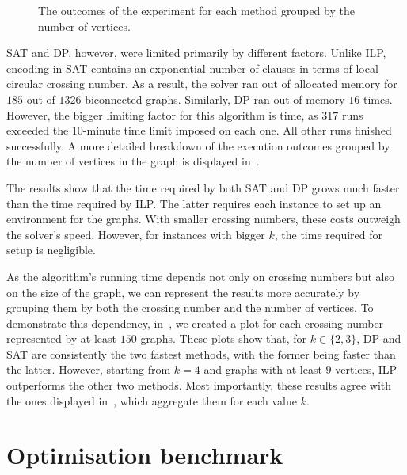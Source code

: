 \begin{figure}
    \centering
    \hfill
    \hfill
    \caption{The outcomes of the experiment for each method grouped by the number of vertices.}
    \label{fig:vertex-dist}
\end{figure}

\textsf{SAT} and \textsf{DP}, however, were limited primarily by different factors. Unlike \textsf{ILP}, encoding in \textsf{SAT} contains an exponential number of clauses in terms of local circular crossing number. As a result, the solver ran out of allocated memory for \(185\) out of \(1326\) biconnected graphs. Similarly, \textsf{DP} ran out of memory \(16\) times. However, the bigger limiting factor for this algorithm is time, as \(317\) runs exceeded the 10-minute time limit imposed on each one. All other runs finished successfully. A more detailed breakdown of the execution outcomes grouped by the number of vertices in the graph is displayed in~.

The results show that the time required by both \textsf{SAT} and \textsf{DP} grows much faster than the time required by \textsf{ILP}. The latter requires each instance to set up an environment for the graphs. With smaller crossing numbers, these costs outweigh the solver's speed. However, for instances with bigger \(k\), the time required for setup is negligible.

As the algorithm's running time depends not only on crossing numbers but also on the size of the graph, we can represent the results more accurately by grouping them by both the crossing number and the number of vertices. To demonstrate this dependency, in~, we created a plot for each crossing number represented by at least \(150\) graphs. These plots show that, for \(k \in \{2, 3\}\), \textsf{DP} and \textsf{SAT} are consistently the two fastest methods, with the former being faster than the latter. However, starting from \(k = 4\) and graphs with at least \(9\) vertices, \textsf{ILP} outperforms the other two methods. Most importantly, these results agree with the ones displayed in~, which aggregate them for each value \(k\).


\section{Optimisation benchmark}

